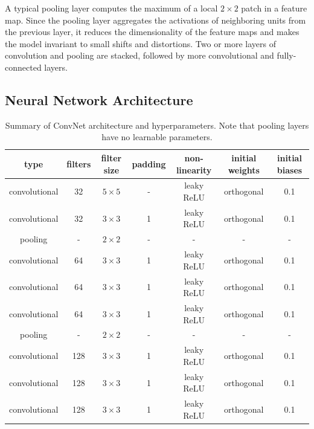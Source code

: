 \documentclass[fleqn,usenatbib]{mnras}
\begin{document}
A typical pooling layer computes the maximum of a local $2\times2$ patch in a feature map.
Since the pooling layer aggregates the activations of neighboring units from the previous layer,
it reduces the dimensionality of the feature maps and
makes the model invariant to small shifts and distortions.
Two or more layers of convolution and pooling are stacked,
followed by more convolutional and fully-connected layers.

\subsection{Neural Network Architecture}

\begin{table}
  \centering
  \caption{Summary of ConvNet architecture and hyperparameters. Note that pooling layers have no learnable parameters.}
  \label{table:hyperparamters}
  \begin{tabular}{ccccccc}
    \hline
    type            & filters & filter size & padding & non-linearity & initial weights & initial biases \\
    \hline
    convolutional   & 32          & $5\times5$  & -       & leaky ReLU    & orthogonal      & 0.1            \\
    convolutional   & 32          & $3\times3$  & 1       & leaky ReLU    & orthogonal      & 0.1            \\
    pooling         & -           & $2\times2$  & -       & -             & -               & -              \\
    convolutional   & 64          & $3\times3$  & 1       & leaky ReLU    & orthogonal      & 0.1            \\
    convolutional   & 64          & $3\times3$  & 1       & leaky ReLU    & orthogonal      & 0.1            \\
    convolutional   & 64          & $3\times3$  & 1       & leaky ReLU    & orthogonal      & 0.1            \\
    pooling         & -           & $2\times2$  & -       & -             & -               & -              \\
    convolutional   & 128         & $3\times3$  & 1       & leaky ReLU    & orthogonal      & 0.1            \\
    convolutional   & 128         & $3\times3$  & 1       & leaky ReLU    & orthogonal      & 0.1            \\
    convolutional   & 128         & $3\times3$  & 1       & leaky ReLU    & orthogonal      & 0.1            \\

\end{tabular}
\end{table}
\end{document}
